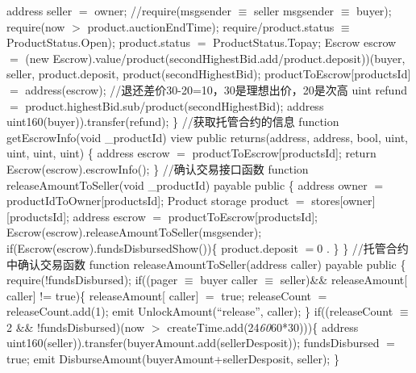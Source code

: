 \documentclass[
  10
]{article}
\begin{document}
address seller \(=\) owner; //require(msgsender \(\equiv\) seller
\textbar\textbar{} msgsender \(\equiv\) buyer); require(now \(>\)
product.auctionEndTime); require/product.status \(\equiv\)
ProductStatus.Open); product.status \(=\) ProductStatus.Topay; Escrow
escrow \(=\) (new
Escrow).value/product(secondHighestBid.add/product.deposit))(buyer,
seller, product.deposit, product(secondHighestBid);
productToEscrow{[}productsId{]} \(=\) address(escrow);
//退还差价30-20=10，30是理想出价，20是次高 uint refund \(=\)
product.highestBid.sub/product(secondHighestBid); address
uint160(buyer)).transfer(refund); \} //获取托管合约的信息 function
getEscrowInfo(void \_productId) view public returns(address, address,
bool, uint, uint, uint, uint) \{ address escrow \(=\)
productToEscrow{[}productsId{]}; return Escrow(escrow).escrowInfo(); \}
//确认交易接口函数 function releaseAmountToSeller(void \_productId)
payable public \{ address owner \(=\) productIdToOwner{[}productsId{]};
Product storage product \(=\) stores{[}owner{]}{[}productsId{]}; address
escrow \(=\) productToEscrow{[}productsId{]};
Escrow(escrow).releaseAmountToSeller(msgsender);
if(Escrow(escrow).fundsDisbursedShow())\{ product.deposit \(= 0\) . \}
\} //托管合约中确认交易函数 function releaseAmountToSeller(address
caller) payable public \{ require(!fundsDisbursed); if((pager \(\equiv\)
buyer \textbar\textbar{} caller \(\equiv\) seller)\&\& releaseAmount{[}
caller{]} != true)\{ releaseAmount{[} caller{]} \(=\) true; releaseCount
\(=\) releaseCount.add(1); emit UnlockAmount(``release'', caller); \}
if((releaseCount \(\equiv\) 2 \&\& !fundsDisbursed)\textbar\textbar(now
\(>\) createTime.add(24\emph{60}60*30)))\{ address
uint160(seller)).transfer(buyerAmount.add(sellerDesposit));
fundsDisbursed \(=\) true; emit
DisburseAmount(buyerAmount+sellerDesposit, seller); \}
\end{document}
